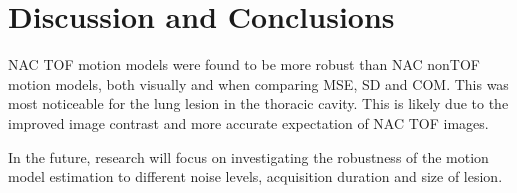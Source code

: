 \documentclass{IEEEtran}
\begin{document}
\section{Discussion and Conclusions}
NAC TOF motion models were found to be more robust than NAC nonTOF motion models, both visually and when comparing MSE, SD and COM. This was most noticeable for the lung lesion in the thoracic cavity. This is likely due to the improved image contrast and more accurate expectation of NAC TOF images.

In the future, research will focus on investigating the robustness of the motion model estimation to different noise levels, acquisition duration and size of lesion.

\AtNextBibliography{\small}
\printbibliography
\end{document}
